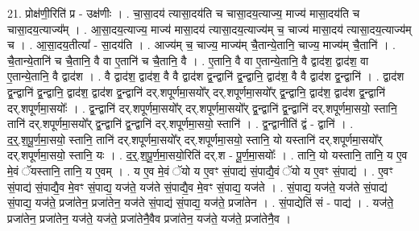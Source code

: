 \documentclass[17pt]{extarticle}
\begin{document}
21. प्रोक्ष॑णी॒रिति॑ प्र - उक्ष॑णीः । . चा॒सा॒दय॑ त्यासा॒दय॑ति च चासा॒दय॒त्याज्य॒ माज्य॑ मासा॒दय॑ति च चासा॒दय॒त्याज्य᳚म् । . आ॒सा॒दय॒त्याज्य॒ माज्य॑ मासा॒दय॑ त्यासा॒दय॒त्याज्य॑म् च॒ चाज्य॑ मासा॒दय॑ त्यासा॒दय॒त्याज्य॑म् च । . आ॒सा॒दय॒तीत्या᳚ - सा॒दय॑ति । . आज्य॑म् च॒ चाज्य॒ माज्य॑म् चै॒तान्ये॒तानि॒ चाज्य॒ माज्य॑म् चै॒तानि॑ । . चै॒तान्ये॒तानि॑ च चै॒तानि॒ वै वा ए॒तानि॑ च चै॒तानि॒ वै । . ए॒तानि॒ वै वा ए॒तान्ये॒तानि॒ वै द्वाद॑श॒ द्वाद॑श॒ वा ए॒तान्ये॒तानि॒ वै द्वाद॑श । . वै द्वाद॑श॒ द्वाद॑श॒ वै वै द्वाद॑श द्व॒न्द्वानि॑ द्व॒न्द्वानि॒ द्वाद॑श॒ वै वै द्वाद॑श द्व॒न्द्वानि॑ । . द्वाद॑श द्व॒न्द्वानि॑ द्व॒न्द्वानि॒ द्वाद॑श॒ द्वाद॑श द्व॒न्द्वानि॑ दर्.शपूर्णमा॒सयो᳚र् दर्.शपूर्णमा॒सयो᳚र् द्व॒न्द्वानि॒ द्वाद॑श॒ द्वाद॑श द्व॒न्द्वानि॑ दर्.शपूर्णमा॒सयोः᳚ । . द्व॒न्द्वानि॑ दर्.शपूर्णमा॒सयो᳚र् दर्.शपूर्णमा॒सयो᳚र् द्व॒न्द्वानि॑ द्व॒न्द्वानि॑ दर्.शपूर्णमा॒सयो॒ स्तानि॒ तानि॑ दर्.शपूर्णमा॒सयो᳚र् द्व॒न्द्वानि॑ द्व॒न्द्वानि॑ दर्.शपूर्णमा॒सयो॒ स्तानि॑ । . द्व॒न्द्वानीति॑ द्वं - द्वानि॑ । . द॒र्॒.श॒पू॒र्ण॒मा॒सयो॒ स्तानि॒ तानि॑ दर्.शपूर्णमा॒सयो᳚र् दर्.शपूर्णमा॒सयो॒ स्तानि॒ यो यस्तानि॑ दर्.शपूर्णमा॒सयो᳚र् दर्.शपूर्णमा॒सयो॒ स्तानि॒ यः । . द॒र्॒.श॒पू॒र्ण॒मा॒सयो॒रिति॑ दर्.श - पू॒र्ण॒मा॒सयोः᳚ । . तानि॒ यो यस्तानि॒ तानि॒ य ए॒व मे॒वं ॅयस्तानि॒ तानि॒ य ए॒वम् । . य ए॒व मे॒वं ॅयो य ए॒वꣳ सं॒पाद्य॑ सं॒पाद्यै॒वं ॅयो य ए॒वꣳ सं॒पाद्य॑ । . ए॒वꣳ सं॒पाद्य॑ सं॒पाद्यै॒व मे॒वꣳ सं॒पाद्य॒ यज॑ते॒ यज॑ते सं॒पाद्यै॒व मे॒वꣳ सं॒पाद्य॒ यज॑ते । . सं॒पाद्य॒ यज॑ते॒ यज॑ते सं॒पाद्य॑ सं॒पाद्य॒ यज॑ते॒ प्रजा॑तेन॒ प्रजा॑तेन॒ यज॑ते सं॒पाद्य॑ सं॒पाद्य॒ यज॑ते॒ प्रजा॑तेन । . सं॒पाद्येति॑ सं - पाद्य॑ । . यज॑ते॒ प्रजा॑तेन॒ प्रजा॑तेन॒ यज॑ते॒ यज॑ते॒ प्रजा॑तेनै॒वैव प्रजा॑तेन॒ यज॑ते॒ यज॑ते॒ प्रजा॑तेनै॒व । \newline
\end{document}
